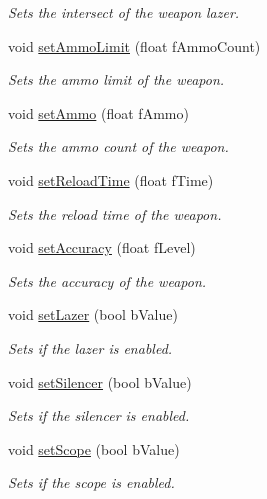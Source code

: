 \begin{DoxyCompactItemize}
\begin{DoxyCompactList}\small\item\em Sets the intersect of the weapon lazer. \end{DoxyCompactList}\item 
void \hyperlink{class_weapon_a2eb5cda468c7c05ef5f4f0223f2a9c7f}{set\+Ammo\+Limit} (float f\+Ammo\+Count)
\begin{DoxyCompactList}\small\item\em Sets the ammo limit of the weapon. \end{DoxyCompactList}\item 
void \hyperlink{class_weapon_afc9beda6416eb70f93402aa7407d5914}{set\+Ammo} (float f\+Ammo)
\begin{DoxyCompactList}\small\item\em Sets the ammo count of the weapon. \end{DoxyCompactList}\item 
void \hyperlink{class_weapon_a29ed8c4bd8eab68e07b5fd3aeadc3261}{set\+Reload\+Time} (float f\+Time)
\begin{DoxyCompactList}\small\item\em Sets the reload time of the weapon. \end{DoxyCompactList}\item 
void \hyperlink{class_weapon_ac396e6daf796e88c13bb030ed3645e4d}{set\+Accuracy} (float f\+Level)
\begin{DoxyCompactList}\small\item\em Sets the accuracy of the weapon. \end{DoxyCompactList}\item 
void \hyperlink{class_weapon_afaa4ee35fb8628f650370c032990149e}{set\+Lazer} (bool b\+Value)
\begin{DoxyCompactList}\small\item\em Sets if the lazer is enabled. \end{DoxyCompactList}\item 
void \hyperlink{class_weapon_ae071c6ea456c6a9f121e434ce7d57162}{set\+Silencer} (bool b\+Value)
\begin{DoxyCompactList}\small\item\em Sets if the silencer is enabled. \end{DoxyCompactList}\item 
void \hyperlink{class_weapon_a106be3929394c3641cb5f4a023e03862}{set\+Scope} (bool b\+Value)
\begin{DoxyCompactList}\small\item\em Sets if the scope is enabled. \end{DoxyCompactList}\item 

\end{DoxyCompactItemize}
